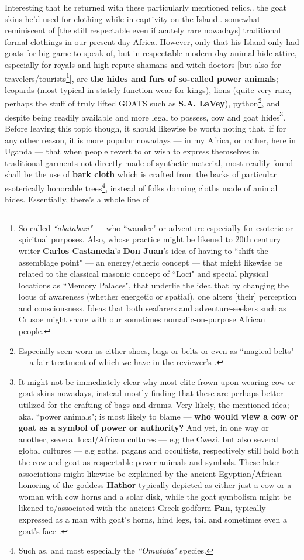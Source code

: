\documentclass[a4paper]{article}
\begin{document}
Interesting that he returned with these particularly mentioned relics.. the goat skins he'd used for clothing while in captivity on the Island.. somewhat reminiscent of [the still respectable even if acutely rare nowadays] traditional formal clothings in our present-day Africa. However, only that his Island only had goats for big game to speak of, but in respectable modern-day animal-hide attire, especially for royals and high-repute shamans and witch-doctors [but also for travelers/tourists\footnote{So-called \textit{``abatabazi"} --- who ``wander" or adventure especially for esoteric or spiritual purposes. Also, whose practice might be likened to 20th century writer \textbf{Carlos Castaneda}'s \textbf{Don Juan}'s idea of having to ``shift the assemblage point" --- an energy/etheric concept --- that might likewise be related to the classical masonic concept of ``Loci" and special physical locations as ``Memory Palaces", that underlie the idea that by changing the locus of awareness (whether energetic or spatial), one alters [their] perception and consciousness. Ideas that both seafarers and adventure-seekers such as Crusoe might share with our sometimes nomadic-on-purpose African people.}], are \textbf{the hides and furs of so-called power animals}; leopards (most typical in stately function wear for kings), lions (quite very rare, perhaps the stuff of truly lifted GOATS such as \textbf{S.A. LaVey}), python\footnote{Especially seen worn as either shoes, bags or belts or even as ``magical belts" --- a fair treatment of which we have in the reviewer's \cite{lutalo_2025_grimlumtauto}.}, and despite being readily available and more legal to possess, cow and goat hides\footnote{It might not be immediately clear why most elite frown upon wearing cow or goat skins nowadays, instead mostly finding that these are perhaps better utilized for the crafting of bags and drums. Very likely, the mentioned idea; aka. ``power animals"; is most likely to blame --- \textbf{who would view a cow or goat as a symbol of power or authority?} And yet, in one way or another, several local/African cultures --- e.g the Cwezi, but also several global cultures --- e.g goths, pagans and occultists, respectively still hold both the cow and goat as respectable power animals and symbols. These later associations might likewise be explained by the ancient Egyptian/African honoring of the goddess \textbf{Hathor} typically depicted as either just a cow or a woman with cow horns and a solar disk, while the goat symbolism might be likened to/associated with the ancient Greek godform \textbf{Pan}, typically expressed as a man with goat's horns, hind legs, tail and sometimes even a goat's face \cite{copilot_assistant}.}. Before leaving this topic though, it should likewise be worth noting that, if for any other reason, it is more popular nowadays --- in my Africa, or rather, here in Uganda --- that when people revert to or wish to express themselves in traditional garments not directly made of synthetic material, most readily found shall be the use of \textbf{bark cloth} which is crafted from the barks of particular esoterically honorable trees\footnote{Such as, and most especially the \textit{``Omutuba"} species.}, instead of folks donning cloths made of animal hides. Essentially, there's a whole line of 
\end{document}
